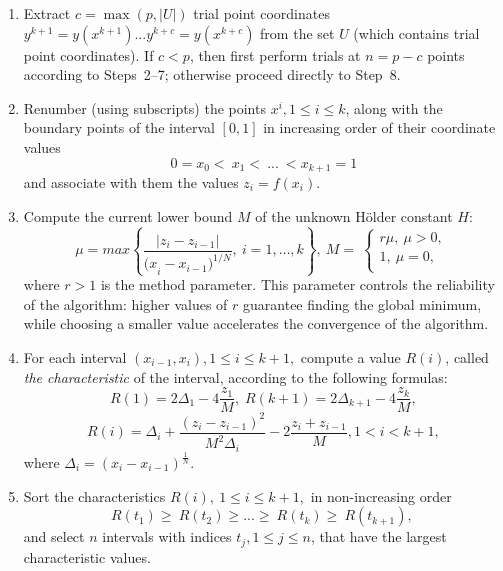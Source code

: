 \documentclass[runningheads]{llncs}
\begin{document}
\begin{enumerate}
	
	\item Extract $c = \max(p, |U|)$ trial point coordinates $y^{k+1}=y\left(x^{k+1}\right) ... y^{k+c}=y\left(x^{k+c}\right)$ from the set $U$ (which contains trial point coordinates). If $c < p$, then first perform trials at $n = p - c$ points according to Steps~2--7; otherwise proceed directly to Step~8.
	
	\item Renumber (using subscripts) the points $x^i, 1\leq i\leq k$,  along with the boundary points of the interval $[0, 1]$ in increasing order of their coordinate values
	\begin{equation} 
		\label{agp1_sort} 	0=x_0<\ x_1<\ ...\ <x_{k+1}=1 	
	\end{equation} 
	and associate with them the values $z_i=f(x_i)$. 
	
	\item  Compute the current lower bound $M$ of the unknown Hölder constant $H$: 
	\begin{equation} 
		\label{agp2_mu} 	\mu=max\left\{\frac{|z_i-z_{i-1}|}{{{(x}_i-x_{i-1})}^{1/N}},\ i=1,\ldots,k\right\},\ M=\  \left\{\begin{matrix}r\mu,\ \mu>0,\\1,\ \mu=0,\\\end{matrix}\right.\ 	
	\end{equation} 
	where $r>1$ is the method parameter. This parameter controls the reliability of the algorithm: higher values of $r$ guarantee finding the global minimum, while choosing a smaller value accelerates the convergence of the algorithm.
	
	\item  For each interval $(x_{i-1},x_i), 1\leq i\leq k+1,$ compute a value $R(i)$, called \textit{the characteristic} of the interval, according to the following formulas:
	\begin{equation} 
		\label{agp3_R1} R(1)=2\Delta_1-4\dfrac{z_1}{M}, \; R(k+1)=2\Delta_{k+1}-4\dfrac{z_k}{M}, 
	\end{equation} 
	\begin{equation} 
		\label{agp3_Ri} R(i)=\Delta_i+\dfrac{(z_i-z_{i-1})^2}{M^2\Delta_i}-2\dfrac{z_i+z_{i-1}}{M},1<i<k+1, 
	\end{equation} 
	where \(\Delta_i=(x_i-x_{i-1})^\frac{1}{N}\).
	
	\item   Sort the characteristics  $R\left(i\right),\ 1\leq i \leq k+1,$  in non-increasing order
	\begin{equation} 
		\label{agp4_R_sort} 	R\left(t_1\right)\geq\ R\left(t_2\right)\geq...\geq\ R\left(t_k\right)\geq\ R(t_{k+1}),\  
	\end{equation} 
and select $n$ intervals with indices $t_j, 1 \le j \le n$, that have the largest characteristic values.	
	

\end{enumerate}
\end{document}
